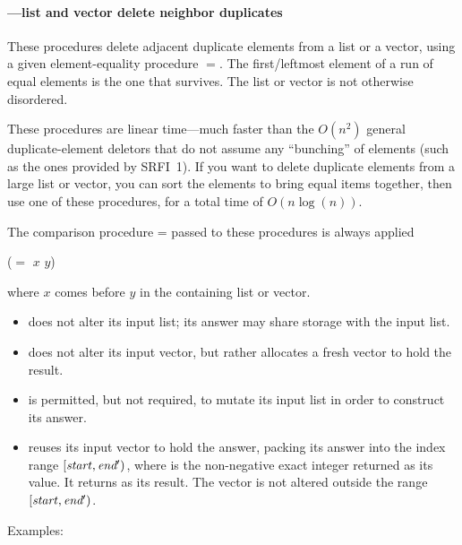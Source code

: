 \paragraph{---list and vector
  delete neighbor duplicates}

\begin{protos}
\end{protos}
%
These procedures delete adjacent duplicate elements from a list or
a vector, using a given element-equality procedure $=$. The first/leftmost
element of a run of equal elements is the one that survives. The list
or vector is not otherwise disordered.

These procedures are linear time---much faster than the $O(n^2)$ general
duplicate-element deletors that do not assume any ``bunching'' of elements
(such as the ones provided by SRFI~1). If you want to delete duplicate
elements from a large list or vector, you can sort the elements to bring
equal items together, then use one of these procedures, for a total time
of $O(n\log(n))$.
    
The comparison procedure = passed to these procedures is always
applied

\begin{example}
(\(=\) \(x\) \(y\))
\end{example}

where $x$ comes before $y$ in the containing list or vector.
%
\begin{itemize}
\item 
{} does not alter its input list; its
answer may share storage with the input list.
\item 
{} does not alter its input vector, but
rather allocates a fresh vector to hold the result.
\item
{} is permitted, but not required, to
mutate its input list in order to construct its answer.
\item
{} reuses its input vector to hold the
answer, packing its answer into the index range
\([\textnormal{\textit{start}},\textnormal{\textit{end$'$}})\), where
 is the non-negative exact integer returned as its value. It
returns  as its result. The vector is not altered outside the range
\([\textnormal{\textit{start}},\textnormal{\textit{end$'$}})\).
\end{itemize}
%
Examples:

